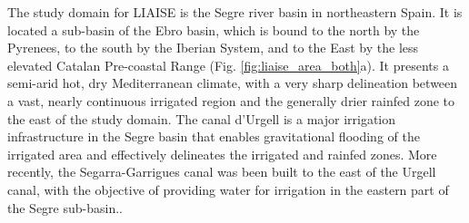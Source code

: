 The study domain for LIAISE is the Segre river basin in northeastern Spain. It is located a sub-basin of the Ebro basin, which is bound to the north by the Pyrenees, to the south by the Iberian System, and to the East by the less elevated Catalan Pre-coastal Range (Fig. \ref{fig:liaise_area_both}a).
It presents a semi-arid hot, dry  Mediterranean climate, with a very sharp delineation between a vast, nearly continuous irrigated region and the generally drier rainfed zone to the east of the study domain. The canal d'Urgell is a major irrigation infrastructure in the Segre basin that enables gravitational flooding of the irrigated area and effectively delineates the irrigated and rainfed zones.
More recently, the Segarra-Garrigues canal was been built to the east of the Urgell canal, with the objective of providing water for irrigation in the eastern part of the Segre sub-basin..

